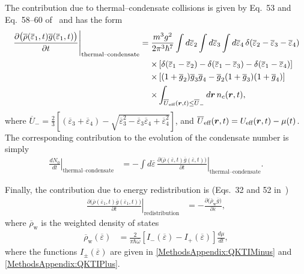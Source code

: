 The contribution due to thermal--condensate collisions is given by Eq.~53 and Eq.~58--60 of~\citep{Bijlsma:2000} and has the form
\begin{align}
    \begin{split}
        \left. \frac{\partial\big(\overline{\rho}(\overline{\varepsilon}_1, t) \overline{g}(\overline{\varepsilon}_1, t)\big)}{\partial t}\right|_\text{thermal--condensate} &= \frac{m^3 g^2}{2 \pi^3 \hbar^7} \int d \overline{\varepsilon}_2 \int d\overline{\varepsilon}_3 \int d\overline{\varepsilon}_4 \,\delta(\overline{\varepsilon}_2 - \overline{\varepsilon}_3 - \overline{\varepsilon}_4)\\
        &\relphantom{=}\times\left[ \delta(\overline{\varepsilon}_1 - \overline{\varepsilon}_2) - \delta(\overline{\varepsilon}_1 - \overline{\varepsilon}_3) - \delta(\overline{\varepsilon}_1- \overline{\varepsilon}_4)\right]\\
        &\relphantom{=} \times \left[(1+\overline{g}_2)\overline{g}_3 \overline{g}_4 - \overline{g}_2 (1+\overline{g}_3)(1+\overline{g}_4) \right]\\
        &\relphantom{=}\times  \int_{\overline{U}_\text{eff}(\vect{r}, t) \leq \overline{U}_-} d \vect{r}\, n_c(\vect{r}, t),
    \end{split}
    \label{MethodsAppendix:QKTRhoGThermalCondensateEvolution}
\end{align}
where $\displaystyle \overline{U}_- = \frac{2}{3}\left[(\overline{\varepsilon}_3 + \overline{\varepsilon}_4)-\sqrt{\overline{\varepsilon}_3^2 - \overline{\varepsilon}_3 \overline{\varepsilon}_4 + \overline{\varepsilon}_4^2}\right]$, and $\overline{U}_\text{eff}(\bm{r}, t) = U_\text{eff}(\bm{r}, t) - \mu(t)$.
The corresponding contribution to the evolution of the condensate number is simply
\begin{align}
    \left. \frac{d N_0}{d t}\right|_\text{thermal--condensate} &= - \int d\overline{\varepsilon} \,\left. \frac{\partial\big(\overline{\rho}(\overline{\varepsilon}, t) \overline{g}(\overline{\varepsilon}, t)\big)}{\partial t}\right|_\text{thermal--condensate}.
    \label{MethodsAppendix:QKTNThermalCondensateEvolution}
\end{align}


Finally, the contribution due to energy redistribution is (Eqs.~32 and 52 in~\citep{Bijlsma:2000})
\begin{align}
    \left. \frac{\partial\big(\overline{\rho}(\overline{\varepsilon}_1, t) \overline{g}(\overline{\varepsilon}_1, t)\big)}{\partial t}\right|_\text{redistribution} &= - \frac{\partial \big( \overline{\rho}_\text{w} \overline{g}\big)}{\partial \overline{\varepsilon}},
    \label{MethodsAppendix:QKTRedistributionEvolution}
\end{align}
where $\overline{\rho}_\text{w}$ is the weighted density of states
\begin{align}
    \overline{\rho}_\text{w}(\overline{\varepsilon}) &= \frac{2}{\pi \hbar \overline{\omega}} \left[ I_-(\overline{\varepsilon}) - I_+(\overline{\varepsilon})\right] \frac{d \mu}{dt},
\end{align}
where the functions $I_\pm(\overline{\varepsilon})$ are given in \eqref{MethodsAppendix:QKTIMinus} and \eqref{MethodsAppendix:QKTIPlus}.



